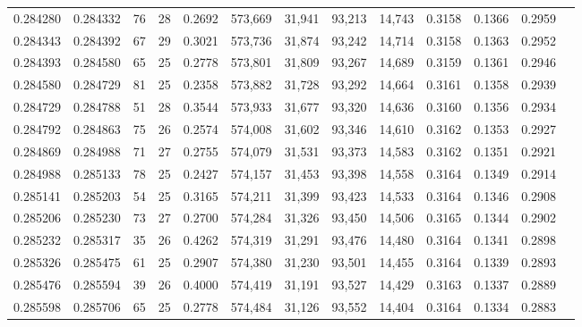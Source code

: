 \begin{tabular}{rrrrrrrrrrrrr}
0.284280 & 0.284332 &  76 &  28 &                                     0.2692 & 573,669 &  31,941 &  93,213 &  14,743 & 0.3158 & 0.1366 & 0.2959 \\
0.284343 & 0.284392 &  67 &  29 &                                     0.3021 & 573,736 &  31,874 &  93,242 &  14,714 & 0.3158 & 0.1363 & 0.2952 \\
0.284393 & 0.284580 &  65 &  25 &                                     0.2778 & 573,801 &  31,809 &  93,267 &  14,689 & 0.3159 & 0.1361 & 0.2946 \\
0.284580 & 0.284729 &  81 &  25 &                                     0.2358 & 573,882 &  31,728 &  93,292 &  14,664 & 0.3161 & 0.1358 & 0.2939 \\
0.284729 & 0.284788 &  51 &  28 &                                     0.3544 & 573,933 &  31,677 &  93,320 &  14,636 & 0.3160 & 0.1356 & 0.2934 \\
0.284792 & 0.284863 &  75 &  26 &                                     0.2574 & 574,008 &  31,602 &  93,346 &  14,610 & 0.3162 & 0.1353 & 0.2927 \\
0.284869 & 0.284988 &  71 &  27 &                                     0.2755 & 574,079 &  31,531 &  93,373 &  14,583 & 0.3162 & 0.1351 & 0.2921 \\
0.284988 & 0.285133 &  78 &  25 &                                     0.2427 & 574,157 &  31,453 &  93,398 &  14,558 & 0.3164 & 0.1349 & 0.2914 \\
0.285141 & 0.285203 &  54 &  25 &                                     0.3165 & 574,211 &  31,399 &  93,423 &  14,533 & 0.3164 & 0.1346 & 0.2908 \\
0.285206 & 0.285230 &  73 &  27 &                                     0.2700 & 574,284 &  31,326 &  93,450 &  14,506 & 0.3165 & 0.1344 & 0.2902 \\
0.285232 & 0.285317 &  35 &  26 &                                     0.4262 & 574,319 &  31,291 &  93,476 &  14,480 & 0.3164 & 0.1341 & 0.2898 \\
0.285326 & 0.285475 &  61 &  25 &                                     0.2907 & 574,380 &  31,230 &  93,501 &  14,455 & 0.3164 & 0.1339 & 0.2893 \\
0.285476 & 0.285594 &  39 &  26 &                                     0.4000 & 574,419 &  31,191 &  93,527 &  14,429 & 0.3163 & 0.1337 & 0.2889 \\
0.285598 & 0.285706 &  65 &  25 &                                     0.2778 & 574,484 &  31,126 &  93,552 &  14,404 & 0.3164 & 0.1334 & 0.2883 \\

\end{tabular}

